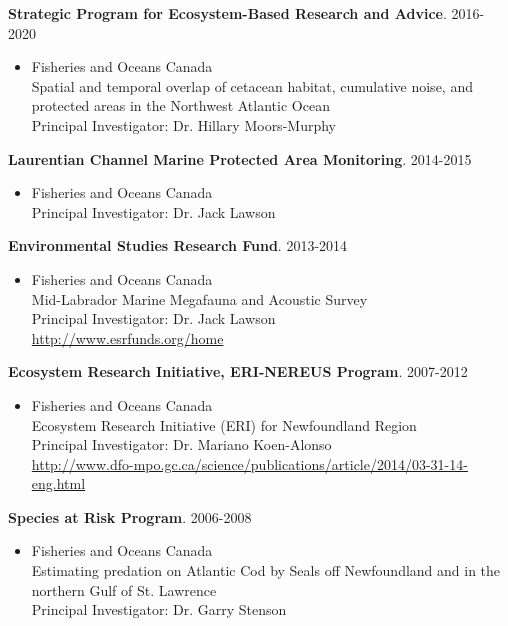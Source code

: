 \documentclass{res}
\begin{document}
\begin{resume}
\textbf{Strategic Program for Ecosystem-Based Research and Advice}. 2016-2020
\begin{itemize} %
	\item[]Fisheries and Oceans Canada\\
Spatial and temporal overlap of cetacean habitat, cumulative noise, and protected areas in the Northwest Atlantic Ocean\\
Principal Investigator: Dr. Hillary Moors-Murphy
\end{itemize}

\textbf{Laurentian Channel Marine Protected Area Monitoring}. 2014-2015
\begin{itemize} %
	\item[]Fisheries and Oceans Canada\\
Principal Investigator: Dr. Jack Lawson
\end{itemize}

\textbf{Environmental Studies Research Fund}. 2013-2014
\begin{itemize} %
	\item[]Fisheries and Oceans Canada\\
Mid-Labrador Marine Megafauna and Acoustic Survey\\
Principal Investigator: Dr. Jack Lawson\\
\url{http://www.esrfunds.org/home}
\end{itemize}

\textbf{Ecosystem Research Initiative, ERI-NEREUS Program}. 2007-2012
\begin{itemize} %
	\item[]Fisheries and Oceans Canada\\
Ecosystem Research Initiative (ERI) for Newfoundland Region\\
Principal Investigator: Dr. Mariano Koen-Alonso\\
\url{http://www.dfo-mpo.gc.ca/science/publications/article/2014/03-31-14-eng.html}
\end{itemize}

\textbf{Species at Risk Program}. 2006-2008
\begin{itemize} %
	\item[] Fisheries and Oceans Canada\\
Estimating predation on Atlantic Cod by Seals off Newfoundland and in the northern Gulf of St. Lawrence \\
Principal Investigator: Dr. Garry Stenson
\end{itemize}


\end{resume}
\end{document}
